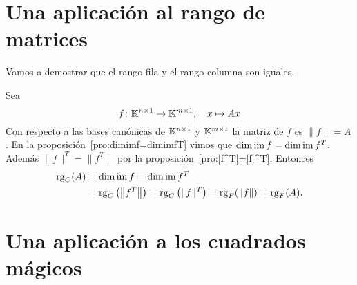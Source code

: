 \section{Una aplicación al rango de matrices}

\begin{block}
    Vamos a demostrar que el rango fila y el rango columna son iguales. 
    
    Sea
    \[
        f\colon\mathbb{K}^{n\times1}\to\mathbb{K}^{m\times1},\quad x\mapsto Ax
    \]
    Con respecto a las bases canónicas de $\mathbb{K}^{n\times1}$ y $\mathbb{K}^{m\times1}$ la
    matriz de $f$ es $\|f\|=A$. En la proposición~\ref{pro:dimimf=dimimfT}
    vimos que $\dim\operatorname{im} f=\dim\operatorname{im} f^T$. Además $\|f\|^T=\|f^T\|$ por la
    proposición~\ref{pro:|f^T|=|f|^T}. Entonces
    \begin{align*}
        \operatorname{rg}_C(A)&=\dim\operatorname{im} f=\dim\operatorname{im} f^T\\
        &=\operatorname{rg}_C\left(\left\|f^T\right\|\right)
        =\operatorname{rg}_C\left(\|f\|^T\right)=\operatorname{rg}_F(\|f\|)=\operatorname{rg}_F(A).
    \end{align*}
\end{block}

\section{Una aplicación a los cuadrados mágicos}

